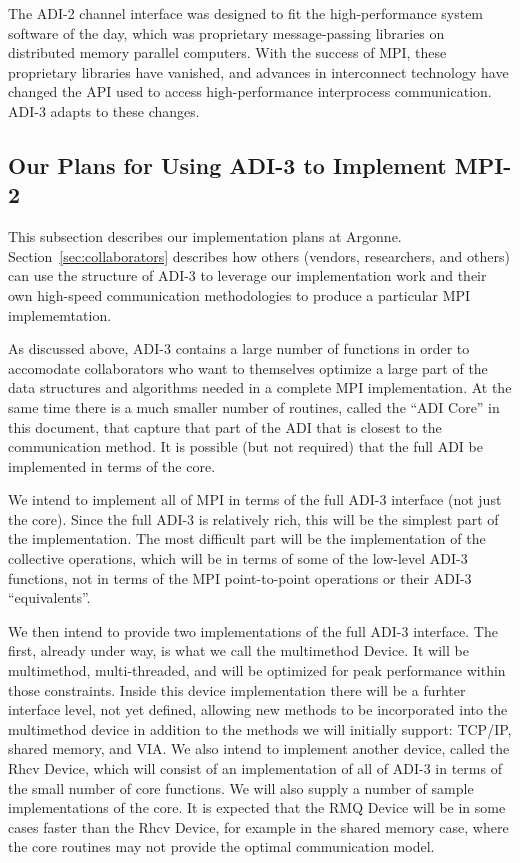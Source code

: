\documentclass[dvipdfm]{article}
\begin{document}
The ADI-2 channel interface was designed to fit the high-performance system
software of the day, which was proprietary message-passing libraries on
distributed memory parallel computers.  With the success of MPI, these
proprietary libraries have vanished, and advances in interconnect technology
have changed the API used to access high-performance interprocess
communication.  ADI-3 adapts to these changes.

\subsection{Our Plans for Using ADI-3 to Implement MPI-2}
\label{sec:plans}

%
%
This subsection describes our implementation plans at Argonne.  
Section~\ref{sec:collaborators} describes how others (vendors,
researchers, and others) can 
use the structure of ADI-3 to leverage our implementation work and their own
high-speed communication methodologies to produce a particular MPI
implememtation.

As discussed above, ADI-3 contains a large number of functions in order to
accomodate collaborators who want to themselves optimize a large part of the
data structures and algorithms needed in a complete MPI implementation.  At the
same time there is a much smaller number of routines, called the ``ADI Core''
in this document, that capture that part of the ADI that is closest to the
communication method. It is possible (but not required) that the full ADI be
implemented in terms of the core.

We intend to implement all of MPI in terms of the full ADI-3 interface (not
just the core).  Since the full ADI-3 is relatively rich, this will be the
simplest part of the implementation.  The most difficult part will be the
implementation of the collective operations, which will be in terms of some of
the low-level ADI-3 functions, not in terms of the MPI point-to-point
operations or their ADI-3 ``equivalents''.

We then intend to provide two implementations of the full ADI-3 interface.
The first, already under way, is what we call the multimethod Device.
It will be  
multimethod, multi-threaded, and will be optimized for peak performance within
those constraints.  Inside this device implementation there will be a furhter
interface level, not yet defined, allowing new methods to be incorporated into
the multimethod device in addition to the methods we will initially
support:  TCP/IP, 
shared memory, and VIA.  We also intend to implement another device, called 
the Rhcv Device, which will consist of an implementation of all of ADI-3 in
terms of the small number of core functions.  We will also supply a number of
sample implementations of the core.  It is expected that the RMQ Device will
be in some cases faster than the Rhcv Device, for example in the shared
memory case, where the core routines may not provide the optimal communication
model. 
\end{document}
